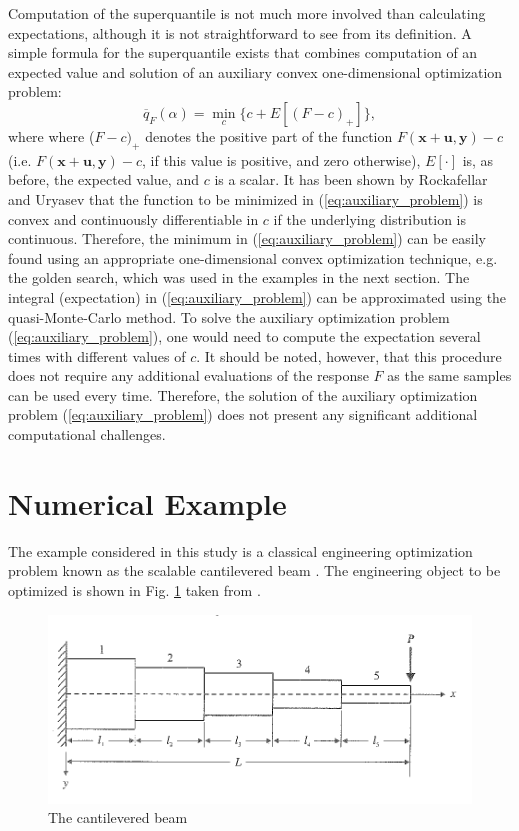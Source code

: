 \documentclass{llncs}
\begin{document}
Computation of the superquantile is not much more involved than calculating expectations, although it is not straightforward to see from its definition. A simple formula for the superquantile exists \cite{RockafellarUryasev2000,RockafellarRoyset2015} that combines computation of an expected value and solution of an auxiliary convex one-dimensional optimization problem:
    \begin{equation} \label{eq:auxiliary_problem}
			\overline{q}_F(\alpha) = \min_c\{c+E\left[(F-c)_+\right]\},
    \end{equation}
where where ($F-c)_+$ denotes the positive part of the function $F(\boldsymbol x+ \boldsymbol u,\boldsymbol y) - c$ (i.e. $F(\boldsymbol x+ \boldsymbol u,\boldsymbol y) - c$, if this value is positive, and zero otherwise), $E[\cdot]$ is, as before, the expected value, and $c$ is a scalar. It has been shown by Rockafellar and Uryasev \cite{RockafellarUryasev2000} that the function to be minimized in (\ref{eq:auxiliary_problem}) is convex and continuously differentiable in $c$ if the underlying distribution is continuous. Therefore, the minimum in (\ref{eq:auxiliary_problem}) can be easily found using an appropriate one-dimensional convex optimization technique, e.g. the golden search, which was used in the examples in the next section. The integral (expectation) in (\ref{eq:auxiliary_problem}) can be approximated using the quasi-Monte-Carlo method. To solve the auxiliary optimization problem (\ref{eq:auxiliary_problem}), one would need to compute the expectation several times with different values of $c$. It should be noted, however, that this procedure does not require any additional evaluations of the response $F$ as the same samples can be used every time. Therefore, the solution of the auxiliary optimization problem (\ref{eq:auxiliary_problem}) does not present any significant additional computational challenges.

\section{Numerical Example}
\label{sec:num_example}

The example considered in this study is a classical engineering optimization problem known as the scalable cantilevered beam \cite{Vanderpllaats2001}. The engineering object to be optimized is shown in Fig. \ref{fig:beam} taken from \cite{Vanderpllaats2001}.

\begin{figure}[ht]
    \centering
    \includegraphics[width=1.0\textwidth]{beam.png}
    \caption{The cantilevered beam}
    \label{fig:beam}
\end{figure}
\end{document}
